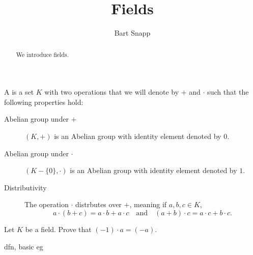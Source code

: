 \documentclass{ximera}
\author{Bart Snapp}
\title{Fields}
\begin{document}
\begin{abstract}
  We introduce fields.
\end{abstract}
\maketitle

\begin{definition}
  A  is a set $K$ with two operations that we will denote
  by $+$ and $\cdot$ such that the following properties hold:
  \begin{description}
  \item[Abelian group under $\pmb{+}$] $(K,+)$ is an Abelian
    group with identity element denoted by $0$.
  \item[Abelian group under $\pmb{\cdot}$] $(K-\{0\},\cdot)$ is
    an Abelian group with identity element denoted by $1$.
  \item[Distributivity] The operation $\cdot$ distrbutes over $+$,
    meaning if $a,b,c\in K$,
    \[
    a\cdot (b+ c) = a\cdot b+ a\cdot c \quad\text{and}\quad (a+ b)\cdot c  = a\cdot c+ b\cdot c.
    \]
  \end{description}
\end{definition}

\begin{exercise}
  Let $K$ be a field. Prove that $(-1)\cdot a = (-a)$.
\end{exercise}



dfn, basic eg
\end{document}
